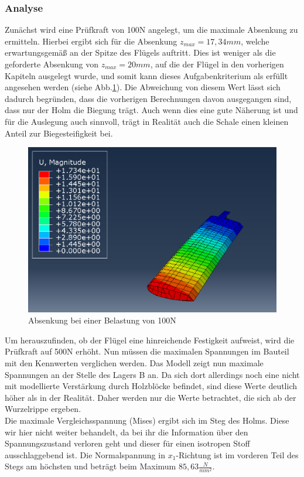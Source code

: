 \subsubsection{Analyse}
Zunächst wird eine Prüfkraft von 100N angelegt, um die maximale Absenkung zu ermitteln. Hierbei ergibt sich für die Absenkung $z_{max}=17,34mm$, welche erwartungsgemäß an der Spitze des Flügels auftritt. Dies ist weniger als die geforderte Absenkung von $z_{max}=20mm$, auf die der Flügel in den vorherigen Kapiteln ausgelegt wurde, und somit kann dieses Aufgabenkriterium als erfüllt angesehen werden (siehe Abb.\ref{Absenkung}). Die Abweichung von diesem Wert lässt sich dadurch begründen, dass die vorherigen Berechnungen davon ausgegangen sind, dass nur der Holm die Biegung trägt. Auch wenn dies eine gute Näherung ist und für die Auslegung auch sinnvoll, trägt in Realität auch die Schale einen kleinen Anteil zur Biegesteifigkeit bei.
\begin{figure}[h]
 \centering
 \includegraphics[scale=0.4]{Bilder/Absenkung_100N}
 \caption{Absenkung bei einer Belastung von 100N}
 \label{Absenkung}
\end{figure}
\noindent Um herauszufinden, ob der Flügel eine hinreichende Festigkeit aufweist, wird die Prüfkraft auf 500N erhöht. Nun müssen die maximalen Spannungen im Bauteil mit den Kennwerten verglichen werden. Das Modell zeigt nun maximale Spannungen an der Stelle des Lagers B an. Da sich dort allerdings noch eine nicht mit modellierte Verstärkung durch Holzblöcke befindet, sind diese Werte deutlich höher als in der Realität. Daher werden nur die Werte betrachtet, die sich ab der Wurzelrippe ergeben.\\
Die maximale Vergleichsspannung (Mises) ergibt sich im Steg des Holms. Diese wir hier nicht weiter behandelt, da bei ihr die Information über den Spannungszustand verloren geht und dieser für einen isotropen Stoff ausschlaggebend ist. Die Normalspannung in $x_{1}$-Richtung ist im vorderen Teil des Stegs am höchsten und beträgt beim Maximum $85,63\frac{N}{mm^2}$.\\
